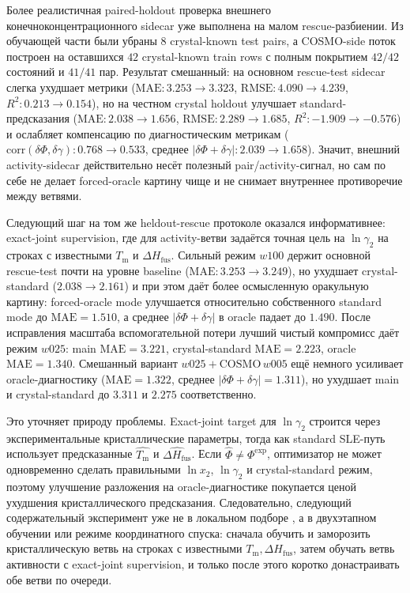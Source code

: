 \documentclass[11pt]{article}
\DeclareRobustCommand{\code}[1]{\texttt{\detokenize{#1}}}
\newcommand{\mae}{\mathrm{MAE}}
\newcommand{\Rtwo}{R^2}
\newcommand{\abs}[1]{\left\lvert #1 \right\rvert}
\newcommand{\Tm}{T_{\mathrm m}}
\newcommand{\dHfus}{\Delta H_{\mathrm{fus}}}
\theoremstyle{definition}
\begin{document}
Более реалистичная paired-holdout проверка внешнего конечноконцентрационного sidecar уже выполнена на малом rescue-разбиении. Из обучающей части были убраны $8$ crystal-known test pairs, а COSMO-side поток построен на оставшихся $42$ crystal-known train rows с полным покрытием $42/42$ состояний и $41/41$ пар. Результат смешанный: на основном rescue-test sidecar слегка ухудшает метрики ($\mae: 3.253\to3.323$, $\mathrm{RMSE}: 4.090\to4.239$, $\Rtwo: 0.213\to0.154$), но на честном crystal holdout улучшает standard-предсказания ($\mae: 2.038\to1.656$, $\mathrm{RMSE}: 2.289\to1.685$, $\Rtwo: -1.909\to-0.576$) и ослабляет компенсацию по диагностическим метрикам ($\mathrm{corr}(\delta\Phi,\delta\gamma): 0.768\to0.533$, среднее $\abs{\delta\Phi+\delta\gamma}: 2.039\to1.658$). Значит, внешний activity-sidecar действительно несёт полезный pair/activity-сигнал, но сам по себе не делает forced-oracle картину чище и не снимает внутреннее противоречие между ветвями.

Следующий шаг на том же heldout-rescue протоколе оказался информативнее: exact-joint supervision, где для activity-ветви задаётся точная цель на $\ln\gamma_2$ на строках с известными $\Tm$ и $\dHfus$. Сильный режим $w100$ держит основной rescue-test почти на уровне baseline ($\mae: 3.253\to3.249$), но ухудшает crystal-standard ($2.038\to2.161$) и при этом даёт более осмысленную оракульную картину: forced-oracle mode улучшается относительно собственного standard mode до $\mae=1.510$, а среднее $\abs{\delta\Phi+\delta\gamma}$ в oracle падает до $1.490$. После исправления масштаба вспомогательной потери лучший чистый компромисс даёт режим $w025$: main $\mae=3.221$, crystal-standard $\mae=2.223$, oracle $\mae=1.340$. Смешанный вариант $w025+\mathrm{COSMO}\,w005$ ещё немного усиливает oracle-диагностику ($\mae=1.322$, среднее $\abs{\delta\Phi+\delta\gamma}=1.311$), но ухудшает main и crystal-standard до $3.311$ и $2.275$ соответственно.

Это уточняет природу проблемы. Exact-joint target для $\ln\gamma_2$ строится через экспериментальные кристаллические параметры, тогда как standard SLE-путь использует предсказанные $\widehat{\Tm}$ и $\widehat{\dHfus}$. Если $\widehat{\Phi}\neq\Phi^{\mathrm{exp}}$, оптимизатор не может одновременно сделать правильными $\ln x_2$, $\ln\gamma_2$ и crystal-standard режим, поэтому улучшение разложения на oracle-диагностике покупается ценой ухудшения кристаллического предсказания. Следовательно, следующий содержательный эксперимент уже не в локальном подборе \code{gamma2_weight}, а в двухэтапном обучении или режиме координатного спуска: сначала обучить и заморозить кристаллическую ветвь на строках с известными $\Tm,\dHfus$, затем обучать ветвь активности с exact-joint supervision, и только после этого коротко донастраивать обе ветви по очереди.
\end{document}
